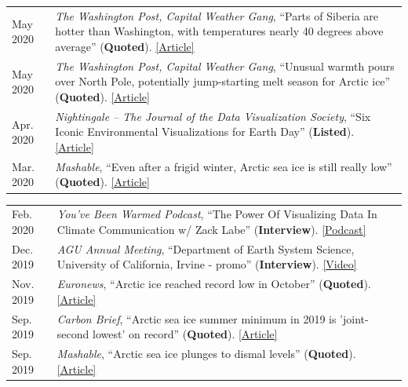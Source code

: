 \documentclass[margin,line,palatino,courier,10pt]{res}
\begin{document}
\begin{resume}
\begin{tabular}{@{}p{0.9in}p{4in}}
May 2020 & \textit{The Washington Post, Capital Weather Gang}, ``Parts of Siberia are hotter than Washington, with temperatures nearly 40 degrees above average'' (\textbf{Quoted}). \href{https://www.washingtonpost.com/weather/2020/05/22/siberia-heat-wave/}{[Article]}\\
May 2020 & \textit{The Washington Post, Capital Weather Gang}, ``Unusual warmth pours over North Pole, potentially jump-starting melt season for Arctic ice'' (\textbf{Quoted}). \href{https://www.washingtonpost.com/weather/2020/05/14/arctic-temperature-spike-sea-ice/}{[Article]}\\
Apr. 2020 & \textit{Nightingale – The Journal of the Data Visualization Society}, ``Six Iconic Environmental Visualizations for Earth Day'' (\textbf{Listed}). \href{https://medium.com/nightingale/six-iconic-environmental-visualizations-for-earth-day-d7a5bdaf177b}{[Article]}\\
Mar. 2020 & \textit{Mashable}, ``Even after a frigid winter, Arctic sea ice is still really low'' (\textbf{Quoted}). \href{https://mashable.com/article/arctic-sea-ice-low-2020/}{[Article]}\\
\end{tabular}
\begin{tabular}{@{}p{0.9in}p{4in}}
Feb. 2020 & \textit{You’ve Been Warmed Podcast}, ``The Power Of Visualizing Data In Climate Communication w/ Zack Labe'' (\textbf{Interview}). \href{https://www.youvebeenwarmed.com/episodes/the-power-of-visualizing-data-in-climate-communication-w-zack-labe}{[Podcast]}\\
Dec. 2019 & \textit{AGU Annual Meeting}, ``Department of Earth System Science, University of California, Irvine - promo'' (\textbf{Interview}). \href{https://www.youtube.com/watch?v=QSDRbSkJeqg&feature=youtu.be}{[Video]}\\
Nov. 2019 & \textit{Euronews}, ``Arctic ice reached record low in October'' (\textbf{Quoted}). \href{https://www.euronews.com/2019/11/04/arctic-ice-reached-record-low-in-october}{[Article]}\\
Sep. 2019 & \textit{Carbon Brief}, ``Arctic sea ice summer minimum in 2019 is 'joint-second lowest' on record'' (\textbf{Quoted}). \href{https://www.carbonbrief.org/arctic-sea-ice-minimum-in-2019-is-joint-second-lowest-on-record}{[Article]}\\
Sep. 2019 & \textit{Mashable}, ``Arctic sea ice plunges to dismal levels'' (\textbf{Quoted}). \href{https://mashable.com/article/arctic-sea-ice-2019-melt/}{[Article]}\\

\end{tabular}
\end{resume}
\end{document}
